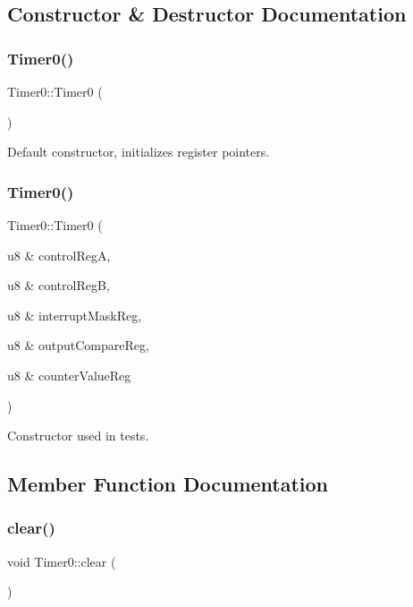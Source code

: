 \subsection{Constructor \& Destructor Documentation}
\mbox{\label{class_timer0_a660c8150e1d5462c7e0cd5b5f173bf5a}} 
\subsubsection{\texorpdfstring{Timer0()}{Timer0()}\hspace{0.1cm}{\footnotesize\ttfamily [1/2]}}
{\footnotesize\ttfamily Timer0\+::\+Timer0 (\begin{DoxyParamCaption}{ }\end{DoxyParamCaption})}

Default constructor, initializes register pointers. \mbox{\label{class_timer0_add6e98a4cf3fcecfe8f2e9372414fbd5}} 
\subsubsection{\texorpdfstring{Timer0()}{Timer0()}\hspace{0.1cm}{\footnotesize\ttfamily [2/2]}}
{\footnotesize\ttfamily Timer0\+::\+Timer0 (\begin{DoxyParamCaption}\item[{u8 \&}]{control\+RegA,  }\item[{u8 \&}]{control\+RegB,  }\item[{u8 \&}]{interrupt\+Mask\+Reg,  }\item[{u8 \&}]{output\+Compare\+Reg,  }\item[{u8 \&}]{counter\+Value\+Reg }\end{DoxyParamCaption})}

Constructor used in tests. 

\subsection{Member Function Documentation}
\mbox{\label{class_timer0_a28a4702cf58fd3cf39ae01e092c0d372}} 
\subsubsection{\texorpdfstring{clear()}{clear()}}
{\footnotesize\ttfamily void Timer0\+::clear (\begin{DoxyParamCaption}{ }\end{DoxyParamCaption})\hspace{0.3cm}{\ttfamily [virtual]}}

